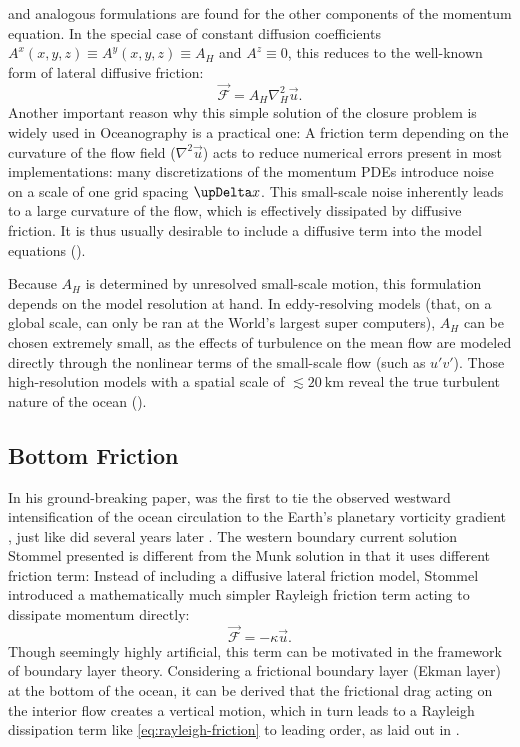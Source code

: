 %
and analogous formulations are found for the other components of the momentum equation. In the special case of constant diffusion coefficients \(A^x(x,y,z) \equiv A^y(x,y,z) \equiv A_H\) and \(A^z \equiv 0\), this reduces to the well-known form of lateral diffusive friction:
%
\begin{equation}
\vec{\mathcal{F}} = A_H \nabla_H^2 \vec{u}.
\end{equation}
%
Another important reason why this simple solution of the closure problem is widely used in Oceanography is a practical one: A friction term depending on the curvature of the flow field (\ie \(\nabla^2 \vec{u}\)) acts to reduce numerical errors present in most implementations: many discretizations of the momentum \acp{PDE} introduce noise on a scale of one grid spacing \(\updel x\). This small-scale noise inherently leads to a large curvature of the flow, which is effectively dissipated by diffusive friction. It is thus usually desirable to include a diffusive term into the model equations (\cf {}).

Because \(A_H\) is determined by unresolved small-scale motion, this formulation depends on the model resolution at hand. In eddy-resolving models (that, on a global scale, can only be ran at the World's largest super computers), \(A_H\) can be chosen extremely small, as the effects of turbulence on the mean flow are modeled directly through the nonlinear terms of the small-scale flow (such as \eg \(u'v'\)). Those high-resolution models with a spatial scale of \(\lesssim \SI{20}{\kilo\metre}\) reveal the true turbulent nature of the ocean ().

\subsection{Bottom Friction}
\label{sec:bottom-friction}
In his ground-breaking paper,  was the first to tie the observed westward intensification of the ocean circulation to the Earth's planetary vorticity gradient \citep{stommel}, just like  did several years later \citep{munk}. The western boundary current solution Stommel presented is different from the Munk solution in that it uses different friction term: Instead of including a diffusive lateral friction model, Stommel introduced a mathematically much simpler Rayleigh friction term acting to dissipate momentum directly:
%
\begin{equation}
\vec{\mathcal{F}} = - \kappa \vec{u}. \label{eq:rayleigh-friction}
\end{equation}
%
Though seemingly highly artificial, this term can be motivated in the framework of boundary layer theory. Considering a frictional boundary layer (Ekman layer) at the bottom of the ocean, it can be derived that the frictional drag acting on the interior flow creates a vertical motion, which in turn leads to a Rayleigh dissipation term like \eqref{eq:rayleigh-friction} to leading order, as laid out in .


